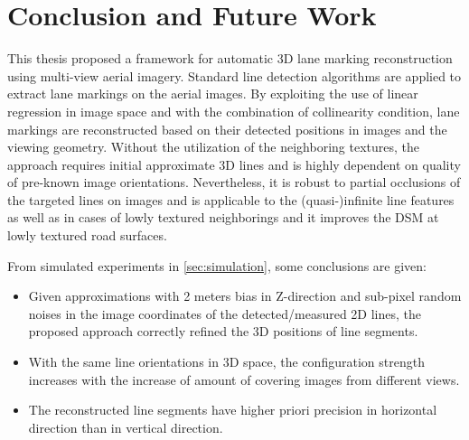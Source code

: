 
\chapter{Conclusion and Future Work}
\label{chap:conclusion}

This thesis proposed a framework for automatic 3D lane marking reconstruction using multi-view aerial imagery. Standard line detection algorithms are applied to extract lane markings on the aerial images. By exploiting the use of linear regression in image space and with the combination of collinearity condition, lane markings are reconstructed based on their detected positions in images and the viewing geometry. Without the utilization of the neighboring textures, the approach requires initial approximate 3D lines and is highly dependent on quality of pre-known image orientations. Nevertheless, it is robust to partial occlusions of the targeted lines on images and is applicable to the (quasi-)infinite line features as well as in cases of lowly textured neighborings and it improves the DSM at lowly textured road surfaces. 


From simulated experiments in \cref{sec:simulation}, some conclusions are given:
\begin{itemize}
	\item Given approximations with 2 meters bias in Z-direction and sub-pixel random noises in the image coordinates of the detected/measured 2D lines, the proposed approach correctly refined the 3D positions of line segments.
	
	\item With the same line orientations in 3D space, the configuration strength increases with the increase of amount of covering images from different views.
	
	\item The reconstructed line segments have higher priori precision in horizontal direction than in vertical direction.
\end{itemize}


